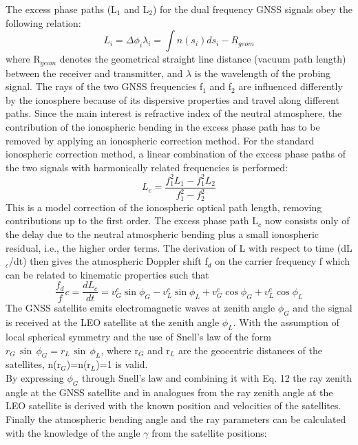 \documentclass[a4paper,12pt,twoside]{article}
\begin{document}
\noindent The excess phase paths (L${}_{1}$ and L${}_{2}$) for the dual frequency GNSS signals obey the following relation:  
\begin{equation}
	L_{i} =\Delta \phi _{i}\lambda _{i} =\int n\left(s_{i} \right) ds_{i} -R_{geom}
\end{equation}
where R${}_{geom}$ denotes the geometrical straight line distance (vacuum path length) between the receiver and transmitter, and $\lambda$ is the wavelength of the probing signal. The rays of the two GNSS frequencies f${}_{1}$ and f${}_{2}$ are influenced differently by the ionosphere because of its dispersive properties and travel along different paths. Since the main interest is refractive index of the neutral atmosphere, the contribution of the ionospheric bending in the excess phase path has to be removed by applying an ionospheric correction method. For the standard ionospheric correction method, a linear combination of the excess phase paths of the two signals with harmonically related frequencies is performed:
\begin{equation}
	L_{c} =\frac{f_{1}^{2} L_{1} -f_{1}^{2} L_{2} }{f_{1}^{2} -f_{2}^{2} } 
\end{equation}
This is a model correction of the ionospheric optical path length, removing contributions up to the first order. The excess phase path L${}_{c}$ now consists only of the delay due to the neutral atmospheric bending plus a small ionospheric residual, i.e., the higher order terms. The derivation of L with respect to time (dL${}_{c}$/dt) then gives the atmospheric Doppler shift f${}_{d}$ on the carrier frequency f which can be related to kinematic properties such that
\begin{equation}
	\frac{f_{d} }{f} c=\frac{dL_{c} }{dt} =v_{G}^{c} \sin \phi _{G} -v_{L}^{c} \sin \phi _{L} +v_{G}^{c} \cos \phi _{G} +v_{L}^{c} \cos\phi _{L} 
\end{equation}
The GNSS satellite emits electromagnetic waves at zenith angle $\phi _{G}$ and the signal is received at the LEO satellite at the zenith angle $\phi _{L} $. With the assumption of local spherical symmetry and the use of Snell's law of the form $r_{G} \, \sin \, \phi _{G} =r_{L\, } \sin \, \phi _{L} $, where r${}_{G}$ and r${}_{L}$ are the geocentric distances of the satellites, n(r${}_{G}$)=n(r${}_{L}$)=1 is valid. \\

\noindent By expressing $\phi _{G}$ through Snell's law and combining it with Eq. 12 the ray zenith angle at the GNSS satellite and in analogues from the ray zenith angle at the LEO satellite is derived with the known position and velocities of the satellites. Finally the atmospheric bending angle and the ray parameters can be calculated with the knowledge of the angle $\gamma$ from the satellite positions:
\end{document}
